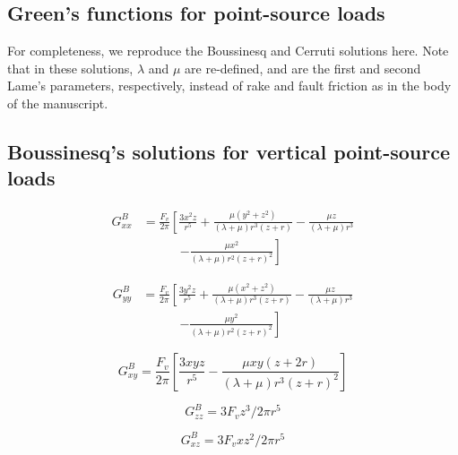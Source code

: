 \documentclass[draft,jgrga]{AGUTeX}
\begin{document}
\begin{article}
\appendix

\section{Green's functions for point-source
loads}\label{greens-functions-for-point-source-loads}
For completeness, we reproduce the Boussinesq \citep[e.g.,][]{jeffreys1970}
and Cerruti \citep[e.g.,][]{love1927} solutions here.
Note that in these solutions, $\lambda$ and $\mu$ are re-defined, and
are the first and second Lame's parameters, respectively, instead of
rake and fault friction as in the body of the manuscript.

\subsection{Boussinesq's solutions for vertical point-source
loads}\label{boussinesqs-solutions-for-vertical-point-source-loads}

\begin{equation}
\begin{split}
G_{xx}^B & = \frac{ F_v }{ 2\pi } \left[ \frac{ 3x^2 z}{ r^5 } \right.
+ \frac{\mu (y^2 + z^2)}{(\lambda + \mu) r^3 (z + r)}
- \frac{\mu z}{(\lambda + \mu) r^3} \\
&\qquad \quad \left. - \frac{\mu x^2}{ (\lambda + \mu) r^2 (z + r)^2 }\right ]
\end{split}
\end{equation}

\begin{equation}
\begin{split}
G_{yy}^B & = \frac{F_v}{2\pi } \left [ \frac{3y^2 z}{r^5} \right.
+ \frac{\mu (x^{2} + z^{2})}{(\lambda + \mu) r^{3}(z + r)}
- \frac{\mu z}{(\lambda + \mu) r ^{3}} \\
& \qquad \quad \left. - \frac{\mu y^{2}}{(\lambda + \mu ) r^2 (z +r)^2} \right]
\end{split}
\end{equation}

\begin{equation}
G_{xy}^{B} = \frac{F _{v}}{2\pi} \left[ \frac{3xyz}{r^{5}}
- \frac{\mu x y (z + 2r)}{(\lambda + \mu) r^{3} (z + r)^{2}} \right]
\end{equation}

\begin{equation}
G_{zz}^{B} = 3 F _{v} z^{3} / 2 \pi r^{5}
\end{equation}

\begin{equation}
G_{xz}^{B} = 3 F _{v} xz^{2} / 2 \pi r^{5}
\end{equation}


\end{article}
\end{document}

